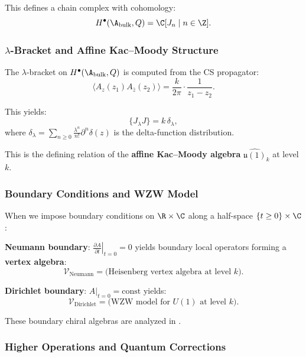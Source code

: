 This defines a chain complex with cohomology:
\begin{equation}
H^\bullet(\A_{\text{bulk}}, Q) = \C[J_n \mid n \in \Z].
\end{equation}

\subsubsection{$\lambda$-Bracket and Affine Kac--Moody Structure}

The $\lambda$-bracket on $H^\bullet(\A_{\text{bulk}}, Q)$ is computed from the CS propagator:
\begin{equation}
\langle A_z(z_1) A_{\bar{z}}(z_2) \rangle = \frac{k}{2\pi} \cdot \frac{1}{z_1 - z_2}.
\end{equation}

This yields:
\begin{equation}
\{J_\lambda J\} = k \, \delta_\lambda,
\end{equation}
where $\delta_\lambda = \sum_{n \geq 0} \frac{\lambda^n}{n!} \partial^n \delta(z)$ is the delta-function distribution.

This is the defining relation of the \textbf{affine Kac--Moody algebra} $\widehat{\mathfrak{u}(1)}_k$ at level $k$.

\subsubsection{Boundary Conditions and WZW Model}

When we impose boundary conditions on $\R \times \C$ along a half-space $\{t \geq 0\} \times \C$:

\textbf{Neumann boundary}: $\left. \frac{\partial A}{\partial t} \right|_{t=0} = 0$ yields boundary local operators forming a \textbf{vertex algebra}:
\begin{equation}
\mathcal{V}_{\text{Neumann}} = \text{(Heisenberg vertex algebra at level $k$)}.
\end{equation}

\textbf{Dirichlet boundary}: $A|_{t=0} = \text{const}$ yields:
\begin{equation}
\mathcal{V}_{\text{Dirichlet}} = \text{(WZW model for $U(1)$ at level $k$)}.
\end{equation}

These boundary chiral algebras are analyzed in \cite{CDG20}.

\subsubsection{Higher Operations and Quantum Corrections}


